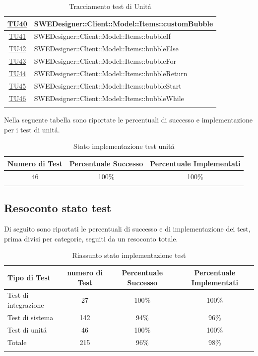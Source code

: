 \documentclass[../PianoDiQualifica.tex]{subfiles}
\begin{document}
\begin{longtable}{|c|l|}
			\hyperlink{TU40}{TU40} & SWEDesigner::Client::Model::Items::customBubble \\
			\hline
			\hyperlink{TU41}{TU41} &SWEDesigner::Client::Model::Items::bubbleIf \\
			\hline
			\hyperlink{TU42}{TU42} &SWEDesigner::Client::Model::Items::bubbleElse \\
			\hline
			\hyperlink{TU43}{TU43} & SWEDesigner::Client::Model::Items::bubbleFor\\
			\hline
			\hyperlink{TU44}{TU44} &SWEDesigner::Client::Model::Items::bubbleReturn \\
			\hline
			\hyperlink{TU45}{TU45} &SWEDesigner::Client::Model::Items::bubbleStart \\
			\hline
			\hyperlink{TU46}{TU46} &SWEDesigner::Client::Model::Items::bubbleWhile \\
			\hline
			\caption[Tracciamento test di Unit\'a]{Tracciamento test di Unit\'a}
			\label{tabella:TracciamentoTestUnit\'a}
		\end{longtable}
		Nella seguente tabella sono riportate le percentuali di successo e implementazione per i test di unit\'a.
			\normalsize
			\begin{longtable}{|c|c|c|}
				\hline
				\textbf{Numero di Test} & \textbf{Percentuale Successo} & \textbf{Percentuale Implementati}\\
				\hline
				\endhead
				46 &100\% &100\%\\
				\hline
				\caption[Stato implementazione test unit\'a]{Stato implementazione test unit\'a}
				\label{tabella:Stato implementazione test unit\'a}
			\end{longtable}
			
		\subsection{Resoconto stato test}
		Di seguito sono riportati le percentuali di successo e di implementazione dei test, prima divisi per categorie, seguiti da un resoconto totale.%
		
		\normalsize
		\begin{longtable}{|l|c|c|c|}
			\hline
			\textbf{Tipo di Test}&\textbf{numero di Test} & \textbf{Percentuale Successo} & \textbf{Percentuale Implementati}\\
			\hline
			\endhead
			Test di integrazione & 27&100\% &100\%\\
			\hline
			Test di sistema & 142&94\% &96\%\\
			\hline
			Test di unit\'a & 46 &100\% &100\%\\
			\hline
			Totale &215 &96\% &98\%\\
			\hline
			\caption[Riassunto stato implementazione test ]{Riassunto stato implementazione test }
			\label{tabella:Riassunto stato implementazione Test }
		\end{longtable}
\end{document}
